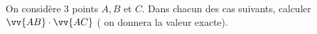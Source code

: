 \documentclass[12pt,a4paper]{article}  %
\begin{document}
\graphicspath{{../images/}}

\begin{center}

\end{center}



%

\vspace{-.3cm} 
On considère 3 points $A, B$ et $C$. Dans chacun des cas suivants, calculer $\vv{A B} \cdot \vv{A C}$ ( on donnera la valeur exacte).
\end{document}
